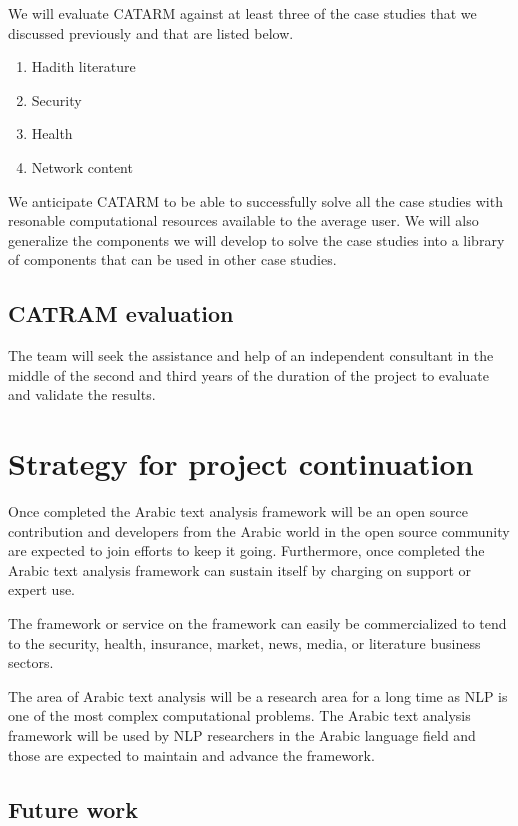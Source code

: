 \documentclass[12pt]{article}
\begin{document}
We will evaluate CATARM against at least three of the case studies
that we discussed previously and that are listed below. 
\begin{enumerate}
\item Hadith literature
\item Security
\item Health
\item Network content
\end{enumerate}

We anticipate CATARM to be able to successfully solve all the case
studies with resonable computational resources available to the 
average user. 
We will also generalize the components we will develop to solve
the case studies into a library of components that can be used
in other case studies. 

\subsection{CATRAM evaluation } 

The team will seek the assistance and help of an independent 
consultant in the middle of the second and third years of 
the duration of the project to evaluate and validate the results.

\section{Strategy for project continuation}
\label{s:continue}


Once completed the Arabic text analysis framework will be 
an open source contribution and developers from the Arabic 
world in the open source community are expected to join 
efforts to keep it going.
Furthermore, once completed the Arabic text analysis framework 
can sustain itself by charging on support or expert use.

The framework or service on the framework can easily be 
commercialized to tend to the security, health, insurance, market,
news, media, or literature business sectors.
 
The area of Arabic text analysis will be a research area for 
a long time as NLP is one of the most complex computational 
problems.
The Arabic text analysis framework will be used by NLP 
researchers in the Arabic language field and those are 
expected to maintain and advance the framework.

\subsection{Future work}
\end{document}
